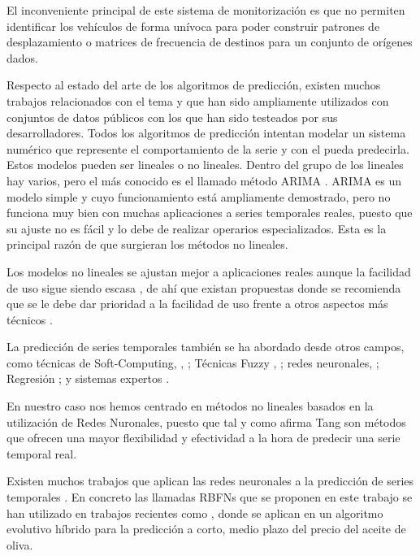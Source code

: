 \documentclass[runningheads]{llncs}
\begin{document}
 
El inconveniente principal de este sistema de monitorización es que no permiten identificar los
vehículos de forma unívoca para poder construir patrones de desplazamiento o matrices de frecuencia
de destinos para un conjunto de orígenes dados. 

Respecto al estado del arte de los algoritmos de predicción, existen muchos trabajos relacionados
con el tema y que han sido ampliamente utilizados con conjuntos de datos públicos con los que han
sido testeados por sus desarrolladores. Todos los algoritmos de predicción intentan modelar un
sistema numérico que represente el comportamiento de la serie y con el pueda predecirla. Estos
modelos pueden ser lineales o no lineales. 
Dentro del grupo de los lineales hay varios, pero el más conocido es el llamado método ARIMA
\cite{BoxJenk}. ARIMA es un modelo simple y cuyo funcionamiento está ampliamente demostrado, pero
no funciona muy bien con muchas aplicaciones a series temporales reales, puesto que su ajuste no es
fácil y lo debe de realizar operarios especializados. Esta es la principal razón de que surgieran
los métodos no lineales. 

Los modelos no lineales se ajustan mejor a aplicaciones reales aunque la facilidad de uso sigue
siendo escasa \cite{Clements2004}, de ahí que existan propuestas donde se recomienda que se le debe
dar prioridad a la facilidad de uso frente a otros aspectos más técnicos \cite{Gooijer25years}. %

La predicción de series temporales también se ha abordado desde otros campos, como técnicas de
Soft-Computing, \cite{Samanta2011}, \cite{Zhu2011}; Técnicas Fuzzy \cite{Qiu2011}, \cite{Wang2011};
redes neuronales, \cite{Yu2010}; Regresión \cite{Kavaklioglu2011}; y sistemas expertos
\cite{Dash1995}.

En nuestro caso nos hemos centrado en métodos no lineales basados en la utilización de Redes
Nuronales, puesto que tal y como afirma Tang \cite{Tang1991} son métodos que ofrecen una mayor
flexibilidad y efectividad a la hora de predecir una serie temporal
real.  %

Existen muchos trabajos que aplican las redes neuronales a la predicción de series temporales
\cite{Rivas04}.  %
En concreto las llamadas RBFNs que se proponen en este trabajo se han utilizado en
trabajos recientes como \cite{Hippert10,Lee09}, %
 \cite{PerezGodoy2010} donde se aplican en un
algoritmo evolutivo híbrido para la predicción a corto, medio plazo
del precio del aceite de oliva. %
\end{document}
